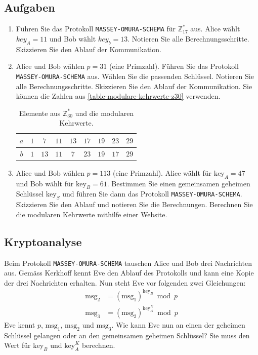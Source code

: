 \subsection{Aufgaben}

\begin{enumerate}
	\item Führen Sie das Protokoll \texttt{MASSEY-OMURA-SCHEMA} für $\mathbb{Z}_{17}^*$ aus. Alice wählt $key_A = 11$ und Bob wählt $key_b = 13$. Notieren Sie alle Berechnungsschritte. Skizzieren Sie den Ablauf der Kommunikation.
	\item Alice und Bob wählen $p = 31$ (eine Primzahl). Führen Sie das Protokoll \texttt{MASSEY-OMURA-SCHEMA} aus. Wählen Sie die passenden Schlüssel. Notieren Sie alle Berechnungsschritte. Skizzieren Sie den Ablauf der Kommunikation. Sie können die Zahlen aus \autoref{table-modulare-kehrwerte-z30} verwenden.

\begin{table}[htb]
\centering
\begin{tabular}{|c|c|c|c|c|c|c|c|c|}
\hline
$a$                         & $1$ & $7$  & $11$ & $13$ & $17$ & $19$ & $23$ & $29$ \\ \hline
$b$ & $1$ & $13$ & $11$ & $7$ & $23$ & $19$ & $17$ & $29$ \\ \hline
\end{tabular}
\caption{Elemente aus $\mathbb{Z}_{30}^*$ und die modularen Kehrwerte.}
\label{table-modulare-kehrwerte-z30}
\end{table}

	\item Alice und Bob wählen $p = 113$ (eine Primzahl). Alice wählt für $\text{key}_A = 47$ und Bob wählt für $\text{key}_B = 61$. Bestimmen Sie einen gemeinsamen geheimen Schlüssel $\text{key}_S$ und führen Sie dann das Protokoll \texttt{MASSEY-OMURA-SCHEMA}. Skizzieren Sie den Ablauf und notieren Sie die Berechnungen. Berechnen Sie die modularen Kehrwerte mithilfe einer Website.
\end{enumerate}

\subsection{Kryptoanalyse}

Beim Protokoll \texttt{MASSEY-OMURA-SCHEMA} tauschen Alice und Bob drei Nachrichten aus. Gemäss Kerkhoff kennt Eve den Ablauf des Protokolls und kann eine Kopie der drei Nachrichten erhalten. Nun steht Eve vor folgenden zwei Gleichungen:
\begin{align*}
	\text{msg}_2 & = (\text{msg}_1)^{\text{key}_B} \bmod p \\
	\text{msg}_3 & = (\text{msg}_2)^{\text{key}_A^K} \bmod p
\end{align*}
Eve kennt $p$, $\text{msg}_1$, $\text{msg}_2$ und $\text{msg}_3$. Wie kann Eve nun an einen der geheimen Schlüssel gelangen oder an den gemeinsamen geheimen Schlüssel? Sie muss den Wert für $\text{key}_B$ und $\text{key}_A^K$ berechnen.

